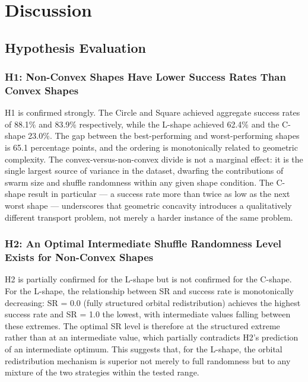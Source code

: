 \chapter{Discussion}
\label{ch:discussion}

\section{Hypothesis Evaluation}
\label{sec:disc_hypotheses}

\subsection*{H1: Non-Convex Shapes Have Lower Success Rates Than Convex Shapes}

H1 is confirmed strongly. The Circle and Square achieved aggregate success rates of 88.1\% and 83.9\% respectively, while the L-shape achieved 62.4\% and the C-shape 23.0\%. The gap between the best-performing and worst-performing shapes is 65.1 percentage points, and the ordering is monotonically related to geometric complexity. The convex-versus-non-convex divide is not a marginal effect: it is the single largest source of variance in the dataset, dwarfing the contributions of swarm size and shuffle randomness within any given shape condition. The C-shape result in particular — a success rate more than twice as low as the next worst shape — underscores that geometric concavity introduces a qualitatively different transport problem, not merely a harder instance of the same problem.

\subsection*{H2: An Optimal Intermediate Shuffle Randomness Level Exists for Non-Convex Shapes}

H2 is partially confirmed for the L-shape but is not confirmed for the C-shape. For the L-shape, the relationship between SR and success rate is monotonically decreasing: SR = 0.0 (fully structured orbital redistribution) achieves the highest success rate and SR = 1.0 the lowest, with intermediate values falling between these extremes. The optimal SR level is therefore at the structured extreme rather than at an intermediate value, which partially contradicts H2's prediction of an intermediate optimum. This suggests that, for the L-shape, the orbital redistribution mechanism is superior not merely to full randomness but to any mixture of the two strategies within the tested range.

